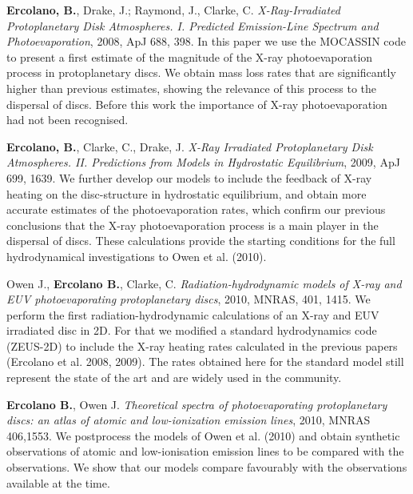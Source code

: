 \documentclass[10pt,fleqn,twoside]{article}
\begin{document}
\begin{literature}

\item \textbf{Ercolano, B.},  Drake, J.; Raymond, J., Clarke, C.
  \textit{X-Ray-Irradiated Protoplanetary Disk Atmospheres. I. Predicted Emission-Line Spectrum and Photoevaporation}, 2008, ApJ
  688, 398. In this paper we use the MOCASSIN code to present a first
  estimate of the magnitude of the X-ray photoevaporation process in
  protoplanetary discs. We obtain mass loss rates that are
  significantly higher than previous estimates, showing
  the relevance of this process to the dispersal of discs. Before this work the
  importance of X-ray photoevaporation had not been recognised.  

\item \textbf{Ercolano, B.}, Clarke, C., Drake, J. \textit{X-Ray
    Irradiated Protoplanetary Disk Atmospheres. II. Predictions from
    Models in Hydrostatic Equilibrium}, 2009, ApJ 699, 1639. We
  further develop our models to include the feedback of X-ray heating
  on the disc-structure in hydrostatic equilibrium, and obtain more
  accurate estimates of the photoevaporation rates, which confirm our
  previous conclusions that the X-ray photoevaporation process is a
  main player in the dispersal of discs. These calculations provide the
  starting conditions for the full hydrodynamical investigations to
  Owen et al. (2010).

\item Owen J., \textbf{Ercolano B.}, Clarke,
  C. \textit{Radiation-hydrodynamic models of X-ray and EUV
    photoevaporating protoplanetary discs}, 2010, MNRAS, 
  401, 1415. We perform the first radiation-hydrodynamic calculations
  of an X-ray and EUV irradiated disc in 2D. For that we modified a
  standard hydrodynamics code (ZEUS-2D) to include the X-ray heating
  rates calculated in the previous papers (Ercolano et al. 2008, 2009). The rates obtained here
  for the standard model still represent the state of the art and are
  widely used in the community. 

\item \textbf{Ercolano B.}, Owen J. {\em Theoretical spectra of
    photoevaporating protoplanetary discs: an atlas of atomic and
    low-ionization emission lines}, 2010, MNRAS 406,1553. We postprocess the
  models of Owen et al. (2010) and obtain synthetic observations of
  atomic and low-ionisation emission lines to be compared with the
  observations. We show that our models compare favourably with the
  observations available at the time.


\end{literature}
\end{document}
